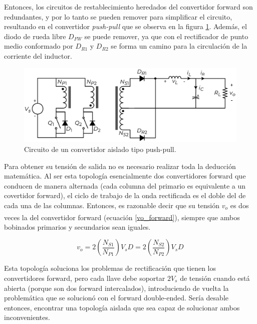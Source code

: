 Entonces, los circuitos de restablecimiento heredados del convertidor forward son redundantes, y por lo tanto se pueden remover para simplificar el circuito, resultando en el {\Medium convertidor \textit{push-pull}} que se observa en la figura \ref{pushpull}. Además, el diodo de rueda libre $D_{FW}$ se puede remover, ya que con el rectificador de punto medio conformado por $D_{R1}$ y $D_{R2}$ se forma un camino para la circulación de la corriente del inductor.\\

\begin{figure}[H]
    \centering
    \includegraphics[scale=0.6]{Imagenes/Push-Pull.pdf}
    \caption{Circuito de un convertidor aislado tipo push-pull.}
    \label{pushpull}
\end{figure}

Para obtener su tensión de salida no es necesario realizar toda la deducción matemática. Al ser esta topología esencialmente dos convertidores forward que conducen de manera alternada (cada columna del primario es equivalente a un covertidor forward), el ciclo de trabajo de la onda rectificada es el doble del de cada una de las columnas. Entonces, es razonable decir que su tensión $v_o$ es dos veces la del convertidor forward (ecuación \ref{vo_forward})\textsuperscript{\cite{PotenciaHart}}, siempre que ambos bobinados primarios y secundarios sean iguales.

\begin{equation}\label{vo_pushpull}
    \boxed{
        v_o = 2\left(\frac{N_{S1}}{N_{P1}}\right)V_sD = 2\left(\frac{N_{S2}}{N_{P2}}\right)V_sD
    }
\end{equation}

Esta topología soluciona los problemas de rectificación que tienen los convertidores forward, pero cada llave debe soportar $2V_s$ de tensión cuando está abierta (porque son dos forward intercalados), introduciendo de vuelta la problemática que se solucionó con el forward double-ended. Sería desable entonces, encontrar una topología aislada que sea capaz de solucionar ambos inconvenientes.\\

